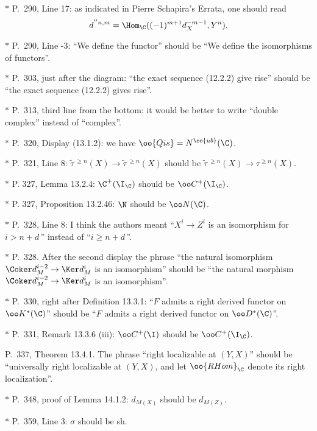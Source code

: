 \documentclass[12pt]{article}
\theoremstyle{remark}
\theoremstyle{definition}
\begin{document}
\begin{s}
\nn$*$ P.~290, Line 17: as indicated in Pierre Schapira's Errata, one should read 
$$
d^{''n,m}=\Hom_\C((-1)^{m+1}d_X^{-m-1},Y^n).
$$
\end{s}

\nn$*$ P.~290, Line -3: ``We define the functor'' should be ``We define the isomorphisms of functors''.

\nn$*$ P.~303, just after the diagram: ``the exact sequence (12.2.2) give rise'' should be ``the exact sequence (12.2.2) gives rise''.

\nn$*$ P.~313, third line from the bottom: it would be better to write ``double complex'' instead of ``complex''.

\nn$*$ P.~320, Display (13.1.2): we have $\oo{Qis}=N^{\oo{ub}}(\C)$.

\nn$*$ P.~321, Line 8: $\widetilde\tau\,{}^{\ge n}(X)\to\widetilde\tau\,{}^{\ge n}(X)$ should be $\widetilde\tau\,{}^{\ge n}(X)\to\tau^{\ge n}(X)$.

\nn$*$ P. 327, Lemma 13.2.4: $\C^+(\I_\C)$ should be $\oo C^+(\I_\C)$.

\nn$*$ P. 327, Proposition 13.2.46: $\N$ should be $\oo N(\C)$.

\nn$*$ P.~328, Line 8: I think the authors meant ``$X^i\to Z^i$ is an isomorphism for $i>n+d\,$'' instead of ``$i\ge n+d\,$''.

\nn$*$ P.~328. After the second display the phrase ``the natural isomorphism $\Coker d_M^{i-2}\to\Ker d_M^i$ is an isomorphism'' should be ``the natural morphism $\Coker d_M^{i-2}\to\Ker d_M^i$ is an isomorphism''.

\nn$*$ P.~330, right after Definition 13.3.1: ``$F$ admits a right derived functor on $\oo K^*(\C)$'' should be ``$F$ admits a right derived functor on $\oo D^*(\C)$''.

\nn$*$ P.~331, Remark 13.3.6 (iii): $\oo C^+(\I)$ should be $\oo C^+(\I_\C)$.

\begin{s}
P.~337, Theorem 13.4.1. %
The phrase ``right localizable at $(Y,X)$'' should be ``universally right localizable at $(Y,X)$, and let $\oo{RHom}_\C$ denote its right localization''.
\end{s}

\nn$*$ P.~348, proof of Lemma 14.1.2: $d_{M(X)}$ should be $d_{M(Z)}$.

\nn$*$ P.~359, Line 3: $\sigma$ should be sh.
\end{document}
